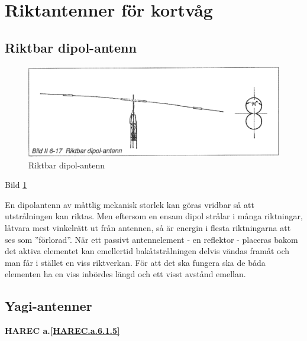 \section{Riktantenner för kortvåg}

\subsection{Riktbar dipol-antenn}

\begin{figure}
  \includegraphics[width=\textwidth]{images/bild_2_6-17}
  \caption{Riktbar dipol-antenn}
  \label{fig:bildII6-17}
\end{figure}

Bild \ref{fig:bildII6-17}

En dipolantenn av måttlig mekanisk storlek kan göras vridbar så att
utstrålningen kan riktas. Men eftersom en ensam dipol strålar i många
riktningar, låtvara mest vinkelrätt ut från antennen, så är energin i
flesta riktningarna att ses som ''förlorad''. När ett passivt
antennelement - en reflektor - placeras bakom det aktiva elementet kan
emellertid bakåtstrålningen delvis vändas framåt och man får i stället
en viss riktverkan. För att det ska fungera ska de båda elementen
ha en viss inbördes längd och ett visst avstånd emellan.


\subsection{Yagi-antenner}
\textbf{
HAREC a.\ref{HAREC.a.6.1.5}\label{myHAREC.a.6.1.5}
}

